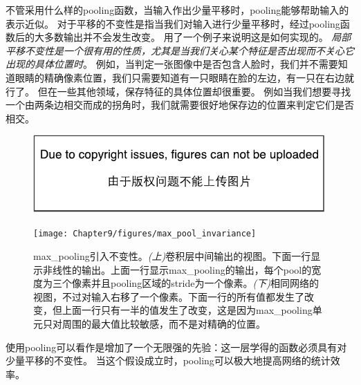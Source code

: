 不管采用什么样的\gls{pooling}函数，当输入作出少量平移时，\gls{pooling}能够帮助输入的表示近似。
对于平移的不变性是指当我们对输入进行少量平移时，经过\gls{pooling}函数后的大多数输出并不会发生改变。
用了一个例子来说明这是如何实现的。
\emph{局部平移不变性是一个很有用的性质，尤其是当我们关心某个特征是否出现而不关心它出现的具体位置时}。
例如，当判定一张图像中是否包含人脸时，我们并不需要知道眼睛的精确像素位置，我们只需要知道有一只眼睛在脸的左边，有一只在右边就行了。
但在一些其他领域，保存特征的具体位置却很重要。
例如当我们想要寻找一个由两条边相交而成的拐角时，我们就需要很好地保存边的位置来判定它们是否相交。
\begin{figure}[!htb]
\ifOpenSource
\centerline{\includegraphics{figure.pdf}}
\else
\centerline{\texttt{[image: Chapter9/figures/max\_pool\_invariance]}}
\fi
\caption{\gls{max_pooling}引入不变性。\emph{(上)}卷积层中间输出的视图。下面一行显示非线性的输出。上面一行显示\gls{max_pooling}的输出，每个\gls{pool}的宽度为三个像素并且\gls{pooling}区域的\gls{stride}为一个像素。\emph{(下)}相同网络的视图，不过对输入右移了一个像素。下面一行的所有值都发生了改变，但上面一行只有一半的值发生了改变，这是因为\gls{max_pooling}单元只对周围的最大值比较敏感，而不是对精确的位置。}
\label{fig:chap9_max_pool_invariance}
\end{figure}

 
使用\gls{pooling}可以看作是增加了一个无限强的先验：这一层学得的函数必须具有对少量平移的不变性。
当这个假设成立时，\gls{pooling}可以极大地提高网络的统计效率。

